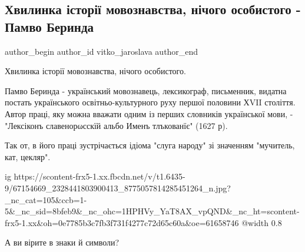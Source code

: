  
 
 
 
 
 
\subsection{Хвилинка історії мовознавства, нічого особистого - Памво Беринда}
\label{sec:23_07_2019.fb.vitko_jaroslava.1.pamvo_berinda}
 
\ifcmt
 author_begin
   author_id vitko_jaroslava
 author_end
\fi

Хвилинка історії мовознавства, нічого особистого. 

Памво Беринда - український мовознавець, лексикограф, письменник, видатна
постать українського освітньо-культурного руху першої половини ХVII століття.
Автор праці, яку можна вважати одним із перших словників української мови, -
"Лексіконъ славенорωсскїй альбо Именъ тлъкованїє" (1627 р). 

Так от, в його праці зустрічається ідіома "слуга народу" зі значенням
"мучитель, кат, цекляр".

\ifcmt
  ig https://scontent-frx5-1.xx.fbcdn.net/v/t1.6435-9/67154669_2328441803900413_8775057814285451264_n.jpg?_nc_cat=105&ccb=1-5&_nc_sid=8bfeb9&_nc_ohc=1HPHVy_YaT8AX_vpQND&_nc_ht=scontent-frx5-1.xx&oh=0e7785b3c7fb3f731f4277c72d65c60a&oe=61658746
  @width 0.8
\fi

А ви вірите в знаки й символи?
